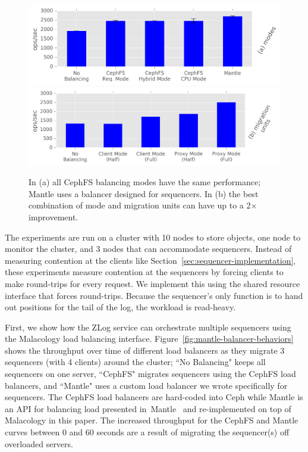 \documentclass[preprint]{sigplanconf-eurosys}
\begin{document}
\begin{figure}[t!]
\centering
\includegraphics{figures/mantle-balancer-performance.png}
\includegraphics{figures/mantle-mode-performance.png}
\caption{In (a) all CephFS balancing modes have the same performance; Mantle uses a
balancer designed for sequencers. In (b) the best combination of mode and
migration units can have up to a 2\(\times\) improvement.}\label{fig:mantle-balancer-performance}
\end{figure}

The experiments are run on a cluster with 10 nodes to store objects, one node
to monitor the cluster, and 3 nodes that can accommodate sequencers. 
Instead of measuring contention at the clients like
Section~\ref{sec:sequencer-implementation}, these experiments measure
contention at the sequencers by forcing clients to make round-trips for every
request. We implement this using the shared resource interface that forces
round-trips.  Because the sequencer's only function is to  hand out positions
for the tail of the log, the workload is read-heavy.

First, we show how the ZLog service can orchestrate multiple sequencers using
the Malacology load balancing interface.
Figure~\ref{fig:mantle-balancer-behaviors} shows the throughput over time of
different load balancers as they migrate 3 sequencers (with 4 clients) around
the cluster; ``No Balancing" keeps all sequencers on one server, ``CephFS"
migrates sequencers using the CephFS load balancers, and ``Mantle" uses a
custom load balancer we wrote specifically for sequencers. The CephFS load
balancers are hard-coded into Ceph while Mantle is an API for balancing load
presented in~Mantle~\cite{sevilla:sc15-mantle} and re-implemented on top of
Malacology in this paper.  The increased throughput for the CephFS and Mantle
curves between 0 and 60 seconds are a result of migrating the sequencer(s) off
overloaded servers.
\end{document}
